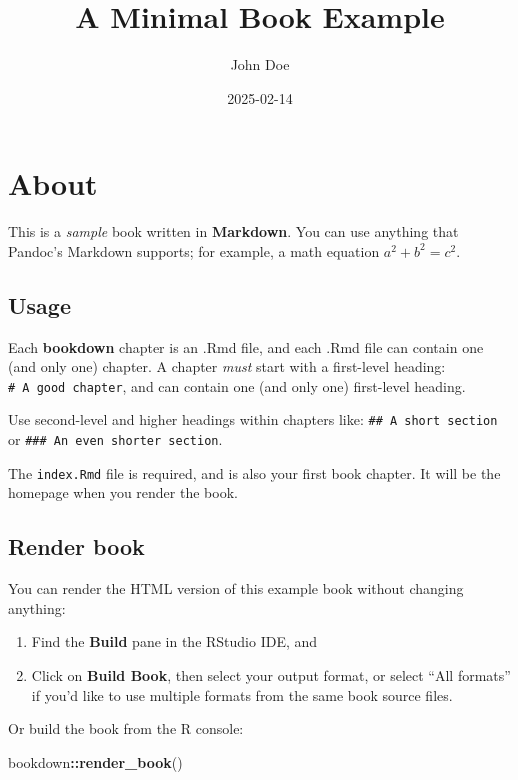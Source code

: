 \documentclass[
]{book}
\title{A Minimal Book Example}
\author{John Doe}
\date{2025-02-14}
\newenvironment{Shaded}{\begin{snugshade}}{\end{snugshade}}
\newcommand{\FunctionTok}[1]{\textcolor[rgb]{0.13,0.29,0.53}{\textbf{#1}}}
\newcommand{\NormalTok}[1]{#1}
\newcommand{\SpecialCharTok}[1]{\textcolor[rgb]{0.81,0.36,0.00}{\textbf{#1}}}
\begin{document}
\maketitle

{
\setcounter{tocdepth}{1}
\tableofcontents
}
\hypertarget{about}{%
\chapter{About}\label{about}}

This is a \emph{sample} book written in \textbf{Markdown}. You can use anything that Pandoc's Markdown supports; for example, a math equation \(a^2 + b^2 = c^2\).

\hypertarget{usage}{%
\section{Usage}\label{usage}}

Each \textbf{bookdown} chapter is an .Rmd file, and each .Rmd file can contain one (and only one) chapter. A chapter \emph{must} start with a first-level heading: \texttt{\#\ A\ good\ chapter}, and can contain one (and only one) first-level heading.

Use second-level and higher headings within chapters like: \texttt{\#\#\ A\ short\ section} or \texttt{\#\#\#\ An\ even\ shorter\ section}.

The \texttt{index.Rmd} file is required, and is also your first book chapter. It will be the homepage when you render the book.

\hypertarget{render-book}{%
\section{Render book}\label{render-book}}

You can render the HTML version of this example book without changing anything:

\begin{enumerate}
\def\labelenumi{\arabic{enumi}.}
\item
  Find the \textbf{Build} pane in the RStudio IDE, and
\item
  Click on \textbf{Build Book}, then select your output format, or select ``All formats'' if you'd like to use multiple formats from the same book source files.
\end{enumerate}

Or build the book from the R console:

\begin{Shaded}
\begin{Highlighting}[]
\NormalTok{bookdown}\SpecialCharTok{::}\FunctionTok{render\_book}\NormalTok{()}
\end{Highlighting}
\end{Shaded}
\end{document}
